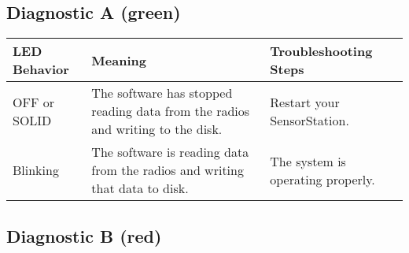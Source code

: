 \documentclass[
]{article}
\begin{document}
\hypertarget{diagnostic-a-green}{%
\subsection{Diagnostic A (green)}\label{diagnostic-a-green}}

\begin{longtable}[]{@{}lll@{}}
\toprule
\begin{minipage}[b]{0.26\columnwidth}\raggedright
LED Behavior\strut
\end{minipage} & \begin{minipage}[b]{0.32\columnwidth}\raggedright
Meaning\strut
\end{minipage} & \begin{minipage}[b]{0.33\columnwidth}\raggedright
Troubleshooting Steps\strut
\end{minipage}\tabularnewline
\midrule
\endhead
\begin{minipage}[t]{0.26\columnwidth}\raggedright
OFF or SOLID\strut
\end{minipage} & \begin{minipage}[t]{0.32\columnwidth}\raggedright
The software has stopped reading data from the radios and writing to the
disk.\strut
\end{minipage} & \begin{minipage}[t]{0.33\columnwidth}\raggedright
Restart your SensorStation.\strut
\end{minipage}\tabularnewline
\begin{minipage}[t]{0.26\columnwidth}\raggedright
Blinking\strut
\end{minipage} & \begin{minipage}[t]{0.32\columnwidth}\raggedright
The software is reading data from the radios and writing that data to
disk.\strut
\end{minipage} & \begin{minipage}[t]{0.33\columnwidth}\raggedright
The system is operating properly.\strut
\end{minipage}\tabularnewline
\bottomrule
\end{longtable}

\hypertarget{diagnostic-b-red}{%
\subsection{Diagnostic B (red)}\label{diagnostic-b-red}}
\end{document}
